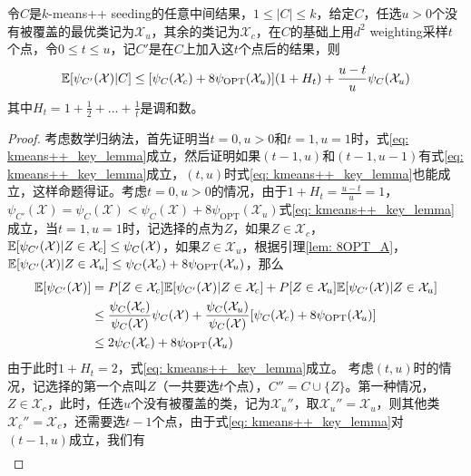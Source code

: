 \begin{lemma}
    \label{lem: kmeans++_key_lemma}
    令$C$是$k$-means++ seeding的任意中间结果，$1 \leq |C| \leq k$，给定$C$，任选$u>0$个没有被覆盖的最优类记为$\mathcal{X}_u$，其余的类记为$\mathcal{X}_c$，在$C$的基础上用$d^2$ weighting采样$t$个点，令$0 \leq t \leq u$，记$C'$是在$C$上加入这$t$个点后的结果，则
    \begin{equation}
        \label{eq: kmeans++_key_lemma}
        \mathbb{E}[\psi_{C'}(\mathcal{X})|C] \leq [\psi_C(\mathcal{X}_c)+8\psi_{\text{OPT}}(\mathcal{X}_u)](1+H_t)+\frac{u-t}{u}\psi_C(\mathcal{X}_u)
    \end{equation}
    其中$H_t = 1+\frac{1}{2}+...+\frac{1}{t}$是调和数。
\end{lemma}
\begin{proof}
    考虑数学归纳法，首先证明当$t=0,u>0$和$t=1,u=1$时，式\ref{eq: kmeans++_key_lemma}成立，然后证明如果$(t-1,u)$和$(t-1,u-1)$有式\ref{eq: kmeans++_key_lemma}成立，$(t,u)$时式\ref{eq: kmeans++_key_lemma}也能成立，这样命题得证。考虑$t=0,u>0$的情况，由于$1+H_t = \frac{u-t}{u} = 1$，$\psi_{C'}(\mathcal{X}) = \psi_C(\mathcal{X}) < \psi_C(\mathcal{X}) + 8\psi_{\text{OPT}}(\mathcal{X}_u)$式\ref{eq: kmeans++_key_lemma}成立，当$t=1,u=1$时，记选择的点为$Z$，如果$Z \in \mathcal{X}_c$，$\mathbb{E}[\psi_{C'}(\mathcal{X})|Z\in \mathcal{X}_c] \leq  \psi_C(\mathcal{X})$，如果$Z \in \mathcal{X}_u$，根据引理\ref{lem: 8OPT_A}，$\mathbb{E}[\psi_{C'}(\mathcal{X})|Z\in \mathcal{X}_u] \leq \psi_C(\mathcal{X}_c) + 8\psi_{\text{OPT}}(\mathcal{X}_u)$，那么
    \begin{align}
        \mathbb{E}[\psi_{C'}(\mathcal{X})] &= P[Z \in \mathcal{X}_c] \mathbb{E}[\psi_{C'}(\mathcal{X})|Z\in \mathcal{X}_c] + P[Z \in \mathcal{X}_u] \mathbb{E}[\psi_{C'}(\mathcal{X})|Z\in \mathcal{X}_u] \\
        & \leq \frac{\psi_C(\mathcal{X}_c)}{\psi_C(\mathcal{X})} \psi_C(\mathcal{X}) + \frac{\psi_C(\mathcal{X}_u)}{\psi_C(\mathcal{X})} [\psi_C(\mathcal{X}_c)+8\psi_{\text{OPT}}(\mathcal{X}_u)] \\
        & \leq 2\psi_C(\mathcal{X}_c)+8\psi_{\text{OPT}}(\mathcal{X}_u)
    \end{align}
    由于此时$1+H_t = 2$，式\ref{eq: kmeans++_key_lemma}成立。
    考虑$(t,u)$时的情况，记选择的第一个点叫$Z$（一共要选$t$个点），$C'' = C\cup\{Z\}$。第一种情况，$Z \in \mathcal{X}_c$，此时，任选$u$个没有被覆盖的类，记为$\mathcal{X}_u''$，取$\mathcal{X}_u'' = \mathcal{X}_u$，则其他类$\mathcal{X}_c'' = \mathcal{X}_c$，还需要选$t-1$个点，由于式\ref{eq: kmeans++_key_lemma}对$(t-1,u)$成立，我们有
    \begin{align}

\end{align}
\end{proof}
